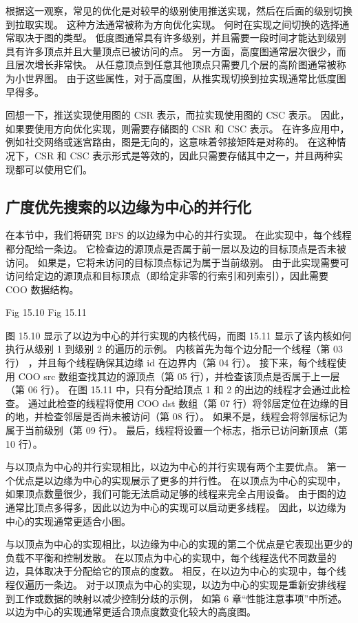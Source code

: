根据这一观察，常见的优化是对较早的级别使用推送实现，然后在后面的级别切换到拉取实现。 这种方法通常被称为方向优化实现。 
何时在实现之间切换的选择通常取决于图的类型。 
低度图通常具有许多级别，并且需要一段时间才能达到级别具有许多顶点并且大量顶点已被访问的点。 
另一方面，高度图通常层次很少，而且层次增长非常快。 从任意顶点到任意其他顶点只需要几个层的高阶图通常被称为小世界图。 
由于这些属性，对于高度图，从推实现切换到拉实现通常比低度图早得多。

回想一下，推送实现使用图的 CSR 表示，而拉实现使用图的 CSC 表示。 
因此，如果要使用方向优化实现，则需要存储图的 CSR 和 CSC 表示。 
在许多应用中，例如社交网络或迷宫路由，图是无向的，这意味着邻接矩阵是对称的。 
在这种情况下，CSR 和 CSC 表示形式是等效的，因此只需要存储其中之一，并且两种实现都可以使用它们。

\subsection{广度优先搜索的以边缘为中心的并行化}
在本节中，我们将研究 BFS 的以边缘为中心的并行实现。 
在此实现中，每个线程都分配给一条边。 它检查边的源顶点是否属于前一层以及边的目标顶点是否未被访问。 
如果是，它将未访问的目标顶点标记为属于当前级别。 
由于此实现需要可访问给定边的源顶点和目标顶点（即给定非零的行索引和列索引），因此需要 COO 数据结构。

{\color{red} Fig 15.10}
{\color{red} Fig 15.11}

图 15.10 显示了以边为中心的并行实现的内核代码，而图 15.11 显示了该内核如何执行从级别 1 到级别 2 的遍历的示例。
内核首先为每个边分配一个线程（第 03 行） ，并且每个线程确保其边缘 id 在边界内（第 04 行）。 
接下来，每个线程使用 COO src 数组查找其边的源顶点（第 05 行），并检查该顶点是否属于上一层（第 06 行）。 
在图 15.11 中，只有分配给顶点 1 和 2 的出边的线程才会通过此检查。 
通过此检查的线程将使用 COO dst 数组（第 07 行）将邻居定位在边缘的目的地，并检查邻居是否尚未被访问（第 08 行）。 
如果不是，线程会将邻居标记为属于当前级别（第 09 行）。 最后，线程将设置一个标志，指示已访问新顶点（第 10 行）。

与以顶点为中心的并行实现相比，以边为中心的并行实现有两个主要优点。 第一个优点是以边缘为中心的实现展示了更多的并行性。 
在以顶点为中心的实现中，如果顶点数量很少，我们可能无法启动足够的线程来完全占用设备。 
由于图的边通常比顶点多得多，因此以边为中心的实现可以启动更多线程。 因此，以边缘为中心的实现通常更适合小图。

与以顶点为中心的实现相比，以边缘为中心的实现的第二个优点是它表现出更少的负载不平衡和控制发散。 
在以顶点为中心的实现中，每个线程迭代不同数量的边，具体取决于分配给它的顶点的度数。 
相反，在以边为中心的实现中，每个线程仅遍历一条边。 
对于以顶点为中心的实现，以边为中心的实现是重新安排线程到工作或数据的映射以减少控制分歧的示例，
如第 6 章“性能注意事项”中所述。 以边为中心的实现通常更适合顶点度数变化较大的高度图。

